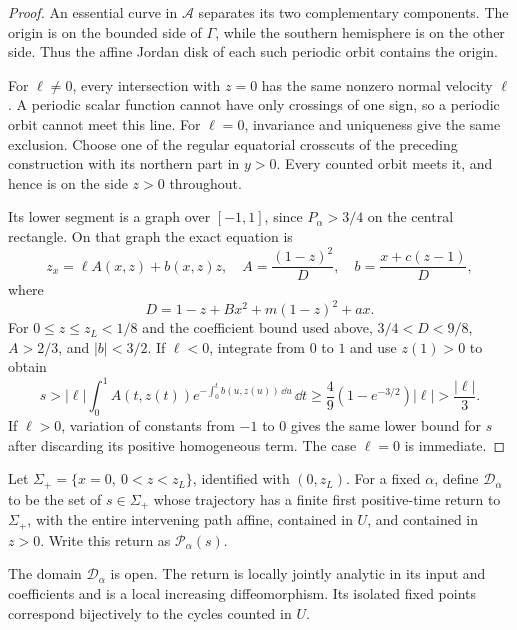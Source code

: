 \begin{proof}
An essential curve in $\mathcal A$ separates its two complementary
components.  The origin is on the bounded side of $\Gamma$, while
the southern hemisphere is on the other side.  Thus the affine Jordan
disk of each such periodic orbit contains the origin.

For $\ell\ne0$, every intersection with $z=0$ has the same nonzero
normal velocity $\ell$.  A periodic scalar function cannot have only
crossings of one sign, so a periodic orbit cannot meet this line.
For $\ell=0$, invariance and uniqueness give the same exclusion.
Choose one of the regular equatorial crosscuts of the preceding
construction with its northern part in $y>0$.  Every counted orbit
meets it, and hence is on the side $z>0$ throughout.

Its lower segment is a graph over $[-1,1]$, since $P_\alpha>3/4$
on the central rectangle.  On that graph the exact equation is
\[
 z_x=\ell A(x,z)+b(x,z)z,
 \quad A=\frac{(1-z)^2}{D},\quad
 b=\frac{x+c(z-1)}{D},
\]
where
\[
 D=1-z+Bx^2+m(1-z)^2+ax.
\]
For $0\le z\le z_L<1/8$ and the coefficient bound used above,
$3/4<D<9/8$, $A>2/3$, and $|b|<3/2$.
If $\ell<0$, integrate from $0$ to $1$ and use $z(1)>0$ to obtain
\[
 s>|\ell|\int_0^1 A(t,z(t))
             e^{-\int_0^t b(u,z(u))\,\dd u}\,\dd t
 \ge\frac49(1-e^{-3/2})|\ell|>\frac{|\ell|}{3}.
\]
If $\ell>0$, variation of constants from $-1$ to $0$ gives the same
lower bound for $s$ after discarding its positive homogeneous term.
The case $\ell=0$ is immediate.
\end{proof}

Let $\Sigma_+=\{x=0,\ 0<z<z_L\}$, identified with $(0,z_L)$.
For a fixed $\alpha$, define $\mathcal D_\alpha$ to be the set of
$s\in\Sigma_+$ whose trajectory has a finite first positive-time
return to $\Sigma_+$, with the entire intervening path affine,
contained in $U$, and contained in $z>0$.  Write this return as
$\mathcal P_\alpha(s)$.

\begin{lemma}\label{rw:geometry:return-domains}
The domain $\mathcal D_\alpha$ is open.  The return is locally jointly
analytic in its input and coefficients and is a local increasing
diffeomorphism.  Its isolated fixed points correspond bijectively to
the cycles counted in $U$.
\end{lemma}

